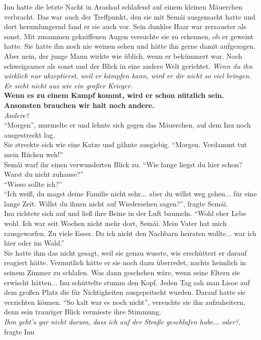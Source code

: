 Inu hatte die letzte Nacht in Arashad schlafend auf einem kleinen Mäuerchen verbracht. Das war auch 
der Treffpunkt, den sie mit Semái ausgemacht hatte und dort herumlungernd fand er sie auch vor. 
Sein dunkles Haar war zerzauster als sonst. Mit zusammen gekniffenen Augen versuchte sie zu 
erkennen, ob er geweint hatte. Sie hatte ihn noch nie weinen sehen und hätte ihn gerne damit 
aufgezogen. Aber nein, der junge Mann wirkte wie üblich, wenn er bekümmert war. Noch schweigsamer 
als sonst und der Blick in eine andere Welt gerichtet. \textit{Wenn du ihn wirklich nur 
akzeptierst, weil er kämpfen kann, wird er dir nicht so viel bringen. Er sieht nicht aus wie ein 
großer Krieger.}\\
\textbf{Wenn es zu einem Kampf kommt, wird er schon nützlich sein. Ansonsten brauchen wir halt noch 
andere.}\\
\textit{Andere?}\\
``Morgen'', murmelte er und lehnte sich gegen das Mäuerchen, auf dem Inu noch ausgestreckt lag. \\
Sie streckte sich wie eine Katze und gähnte ausgiebig. ``Morgen. Verdammt tut mein Rücken weh!''\\
Semái warf ihr einen verwunderten Blick zu. ``Wie lange liegst du hier schon? Warst du nicht 
zuhause?''\\
``Wieso sollte ich?''\\
``Ich weiß, du magst deine Familie nicht sehr... aber du willst weg gehen... für eine lange Zeit. 
Willst du ihnen nicht auf Wiedersehen sagen?'', fragte Semái.\\
Inu richtete sich auf und ließ ihre Beine in der Luft baumeln. ``Wohl eher Lebe wohl. Ich war seit 
Wochen nicht mehr dort, Semái. Mein Vater hat mich rausgeworfen. Zu viele Esser. Da ich nicht den 
Nachbarn heiraten wollte... war ich hier oder im Wald.''\\
Sie hatte ihm das nicht gesagt, weil sie genau wusste, wie erschüttert er darauf reagiert hätte. 
Vermutlich hätte er sie noch dazu überredet, nachts heimlich in seinem Zimmer zu schlafen. Was dann 
geschehen wäre, wenn seine Eltern sie erwischt hätten... Inu schüttelte stumm den Kopf. Jeden Tag 
sah man Lisoe auf dem großen Platz die für Nichtigkeiten ausgepeitscht wurden. Darauf hatte sie 
verzichten können. ``So kalt war es noch nicht'', versuchte sie ihn aufzuheitern, denn sein 
trauriger Blick vermieste ihre Stimmung.\\
\textit{Ihm geht's gar nicht darum, dass ich auf der Straße geschlafen habe... oder?}, fragte Inu 
